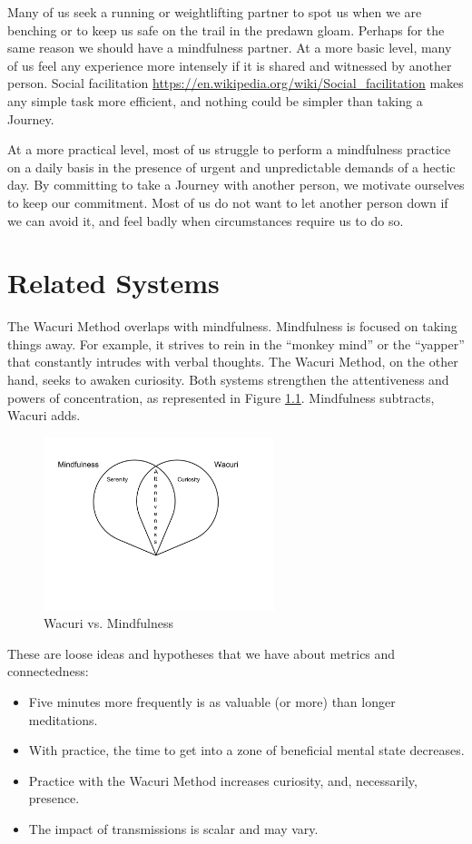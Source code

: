 \documentclass[12pt]{book}
\begin{document}
Many of us seek a running or weightlifting partner to spot
us when we are benching or to keep us safe on the trail in the
predawn gloam.  Perhaps for the same reason we should have a
mindfulness partner.  At a more basic level, many of us feel any
experience more intensely if it is shared and witnessed by another
person.   Social facilitation \url{https://en.wikipedia.org/wiki/Social_facilitation} makes any simple task more efficient, and
nothing could be simpler than taking a Journey.

At a more practical level, most of us struggle to perform a
mindfulness practice on a daily basis in the presence of urgent and
unpredictable demands of a hectic day.  By committing to take a Journey
with another person, we motivate ourselves to keep our commitment. Most
of us do not want to let another person down if we can avoid it, and
feel badly when circumstances require us to do so.

\chapter{Related Systems}

The Wacuri Method overlaps with mindfulness.  Mindfulness is focused
on taking things away. For example, it strives to rein in the
``monkey mind'' or the ``yapper'' that constantly intrudes with
verbal thoughts. The Wacuri Method, on the other hand, seeks
to awaken curiosity. Both systems strengthen the attentiveness
and powers of concentration, as represented in Figure \ref{fig:wacurivsmindfulness}. Mindfulness subtracts, Wacuri adds.

\begin{figure}
  \centering
     \includegraphics[width=0.6\textwidth]{WacuriFigures/WacuriMindfulnessDiagram.png}
     \caption{Wacuri vs. Mindfulness}
  \label{fig:wacurivsmindfulness}     
\end{figure}

These are loose ideas and hypotheses that we have about metrics and connectedness:
\begin{itemize}
\item Five minutes more frequently is as valuable (or more) than longer meditations.
\item With practice, the time to get into a zone of beneficial mental state decreases.
\item Practice with the Wacuri Method increases curiosity, and, necessarily, presence.
  \item The impact of transmissions is scalar and may vary.
\end{itemize}
\end{document}

